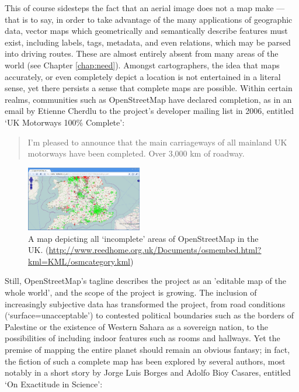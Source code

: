 \documentclass[11pt,oneside,notitlepage]{report}
\begin{document}
{{This of course sidesteps the fact that an aerial image does not a map make --- that is to say, in order to take advantage of the many applications of geographic data, vector maps which geometrically and semantically describe features must exist, including labels, tags, metadata, and even relations, which may be parsed into driving routes. These are almost entirely absent from many areas of the world (see Chapter \ref{chap:need}). Amongst cartographers, the idea that maps accurately, or even completely depict a location is not entertained in a literal sense, yet there persists a sense that complete maps are possible. Within certain realms, communities such as OpenStreetMap have declared completion, as in an email by Etienne Cherdlu to the project's developer mailing list in 2006, entitled `UK Motorways 100\% Complete': \begin{quote}I'm pleased to announce that the main carriageways of all mainland UK motorways have been completed. Over 3,000 km of roadway.\end{quote}

\begin{figure}
	\begin{flushright}
		\includegraphics[width=0.45\textwidth]{images/osm-missing-parts.png}
	\caption{A map depicting all `incomplete' areas of OpenStreetMap in the UK. (\url{http://www.reedhome.org.uk/Documents/osmembed.html?kml=KML/osmcategory.kml})}
	\end{flushright}
\end{figure}

Still, OpenStreetMap's tagline describes the project as an 'editable map of the whole world', and the scope of the project is growing. The inclusion of increasingly subjective data has transformed the project, from road conditions (`surface=unacceptable') to contested political boundaries such as the borders of Palestine or the existence of Western Sahara as a sovereign nation, to the possibilities of including indoor features such as rooms and hallways. Yet the premise of mapping the entire planet should remain an obvious fantasy; in fact, the fiction of such a complete map has been explored by several authors, most notably in a short story by Jorge Luis Borges and Adolfo Bioy Casares, entitled `On Exactitude in Science':

}}
\end{document}
